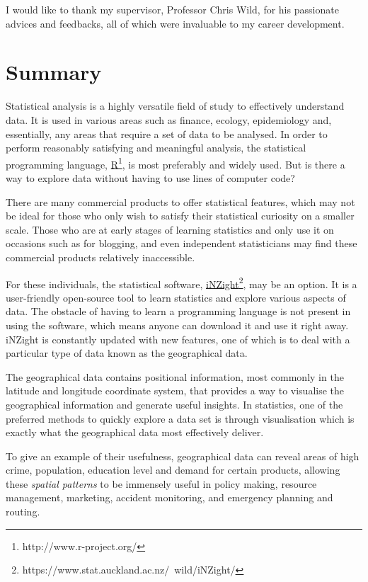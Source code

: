 \documentclass[a4paper, 12pt]{article}
\begin{document}
I would like to thank my supervisor, Professor Chris Wild, for his passionate advices and feedbacks, all of which were invaluable to my career development.

\newpage
\section*{Summary}
Statistical analysis is a highly versatile field of study to effectively understand data. It is used in various areas such as finance, ecology, epidemiology and, essentially, any areas that require a set of data to be analysed. In order to perform reasonably satisfying and meaningful analysis, the statistical programming language, \href{http://www.r-project.org/}{R}\footnote{http://www.r-project.org/}, is most preferably and widely used. But is there a way to explore data without having to use lines of computer code?

There are many commercial products to offer statistical features, which may not be ideal for those who only wish to satisfy their statistical curiosity on a smaller scale. Those who are at early stages of learning statistics and only use it on occasions such as for blogging, and even independent statisticians may find these commercial products relatively inaccessible.

For these individuals, the statistical software, \href{https://www.stat.auckland.ac.nz/~wild/iNZight/}{iNZight}\footnote{https://www.stat.auckland.ac.nz/~wild/iNZight/}, may be an option. It is a user-friendly open-source tool to learn statistics and explore various aspects of data. The obstacle of having to learn a programming language is not present in using the software, which means anyone can download it and use it right away. iNZight is constantly updated with new features, one of which is to deal with a particular type of data known as the geographical data.

The geographical data contains positional information, most commonly in the latitude and longitude coordinate system, that provides a way to visualise the geographical information and generate useful insights. In statistics, one of the preferred methods to quickly explore a data set is through visualisation which is exactly what the geographical data most effectively deliver.

To give an example of their usefulness, geographical data can reveal areas of high crime, population, education level and demand for certain products, allowing these \emph{spatial patterns} to be immensely useful in policy making, resource management, marketing, accident monitoring, and emergency planning and routing.
\end{document}
